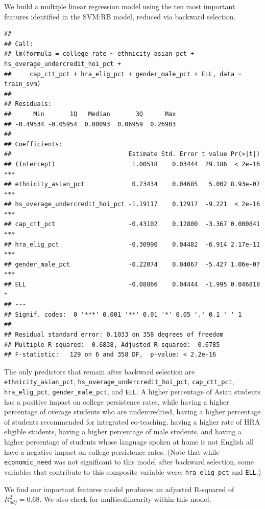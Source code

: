 \documentclass[
  man,floatsintext]{apa6}
\begin{document}
We build a multiple linear regression model using the ten most important features identified in the SVM:RB model, reduced via backward selection.

\begin{verbatim}
## 
## Call:
## lm(formula = college_rate ~ ethnicity_asian_pct + hs_overage_undercredit_hoi_pct + 
##     cap_ctt_pct + hra_elig_pct + gender_male_pct + ELL, data = train_svm)
## 
## Residuals:
##      Min       1Q   Median       3Q      Max 
## -0.49534 -0.05954  0.00093  0.06959  0.26903 
## 
## Coefficients:
##                                Estimate Std. Error t value Pr(>|t|)    
## (Intercept)                     1.00518    0.03444  29.186  < 2e-16 ***
## ethnicity_asian_pct             0.23434    0.04685   5.002 8.93e-07 ***
## hs_overage_undercredit_hoi_pct -1.19117    0.12917  -9.221  < 2e-16 ***
## cap_ctt_pct                    -0.43102    0.12800  -3.367 0.000841 ***
## hra_elig_pct                   -0.30990    0.04482  -6.914 2.17e-11 ***
## gender_male_pct                -0.22074    0.04067  -5.427 1.06e-07 ***
## ELL                            -0.08866    0.04444  -1.995 0.046818 *  
## ---
## Signif. codes:  0 '***' 0.001 '**' 0.01 '*' 0.05 '.' 0.1 ' ' 1
## 
## Residual standard error: 0.1033 on 358 degrees of freedom
## Multiple R-squared:  0.6838, Adjusted R-squared:  0.6785 
## F-statistic:   129 on 6 and 358 DF,  p-value: < 2.2e-16
\end{verbatim}

The only predictors that remain after backward selection are \texttt{ethnicity\_asian\_pct}, \texttt{hs\_overage\_undercredit\_hoi\_pct}, \texttt{cap\_ctt\_pct}, \texttt{hra\_elig\_pct}, \texttt{gender\_male\_pct}, and \texttt{ELL}. A higher percentage of Asian students has a positive impact on college persistence rates, while having a higher percentage of overage students who are undercredited, having a higher percentage of students recommended for integrated co-teaching, having a higher rate of HRA eligible students, having a higher percentage of male students, and having a higher percentage of students whose language spoken at home is not English all have a negative impact on college persistence rates. (Note that while \texttt{economic\_need} was not significant to this model after backward selection, some variables that contribute to this composite variable were: \texttt{hra\_elig\_pct} and \texttt{ELL}.)

We find our important features model produces an adjusted R-squared of \(R^2_{adj} = 0.68\). We also check for multicollinearity within this model.
\end{document}
